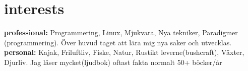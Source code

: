 \documentclass[]{cv-style}          %
\begin{document}
%
%

\section{interests}
  \vspace{-0.2cm}

  \textbf{professional:} Programmering, Linux, Mjukvara, Nya tekniker, 
  Paradigmer (programmering).
  Över huvud taget att lära mig nya saker och utvecklas.\\
\textbf{personal:} Kajak, Friluftliv, Fiske, Natur, Rustikt leverne(bushcraft), 
Växter, Djurliv. Jag läser mycket(ljudbok) oftast fakta normalt 50+ böcker/år

\end{document}
